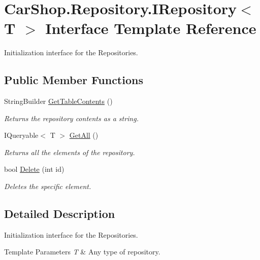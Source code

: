 \hypertarget{interface_car_shop_1_1_repository_1_1_i_repository}{}\section{Car\+Shop.\+Repository.\+I\+Repository$<$ T $>$ Interface Template Reference}
\label{interface_car_shop_1_1_repository_1_1_i_repository}


Initialization interface for the Repositories.  


\subsection*{Public Member Functions}
\begin{DoxyCompactItemize}
\item 
String\+Builder \mbox{\hyperlink{interface_car_shop_1_1_repository_1_1_i_repository_a36fd2e239dc17c35fe1c732efdeb131b}{Get\+Table\+Contents}} ()
\begin{DoxyCompactList}\small\item\em Returns the repository contents as a string. \end{DoxyCompactList}\item 
I\+Queryable$<$ T $>$ \mbox{\hyperlink{interface_car_shop_1_1_repository_1_1_i_repository_ac595c3fa4a5bcf55a3c0c56a61060d40}{Get\+All}} ()
\begin{DoxyCompactList}\small\item\em Returns all the elements of the repository. \end{DoxyCompactList}\item 
bool \mbox{\hyperlink{interface_car_shop_1_1_repository_1_1_i_repository_aeb1731dedbb0cb9d3e70d67e9b35f409}{Delete}} (int id)
\begin{DoxyCompactList}\small\item\em Deletes the specific element. \end{DoxyCompactList}\end{DoxyCompactItemize}


\subsection{Detailed Description}
Initialization interface for the Repositories. 


\begin{DoxyTemplParams}{Template Parameters}
{\em T} & Any type of repository.\\
\hline
\end{DoxyTemplParams}


